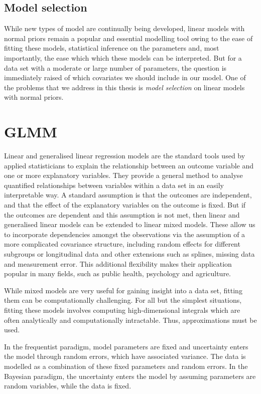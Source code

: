 \subsection{Model selection}
While new types of model are continually being developed, linear models with normal priors remain a popular
and essential modelling tool owing to the ease of fitting these models, statistical inference on the
parameters and, most importantly, the ease which which these models can be interpreted. But for a data set
with a moderate or large number of parameters, the question is immediately raised of which covariates we should
include in our model. One of the problems that we address in this thesis is \emph{model selection} on linear
models with normal priors.

\section{GLMM}
Linear and generalised linear regression models are the standard tools used by applied statisticians to
explain the relationship between an outcome variable and one or more explanatory variables. They provide a
general method  to analyse quantified relationships between variables within a data set in an easily
interpretable way. A standard assumption is that the outcomes are independent, and that the effect of the
explanatory variables on the outcome is fixed. But if the outcomes are dependent and this assumption is not
met, then linear and generalised linear models can be extended to linear mixed models. These allow us to
incorporate dependencies amongst the  observations via the assumption of a more complicated covariance
structure, including random effects for  different subgroups or longitudinal data and other extensions such as
splines, missing data and measurement error. This additional flexibility makes their application popular in
many fields, such as public health, psychology and agriculture.

While mixed models are very useful for gaining insight into a data set, fitting them can be computationally
challenging. For all but the simplest situations, fitting these models involves computing high-dimensional
integrals which are often analytically and computationally intractable. Thus, approximations must be used.

In the frequentist paradigm, model parameters are fixed and uncertainty enters the model through random
errors, which have associated variance. The data is modelled as a combination of these fixed parameters and
random errors. In the Bayesian paradigm, the uncertainty enters the model by assuming parameters are random
variables, while the data is fixed.

